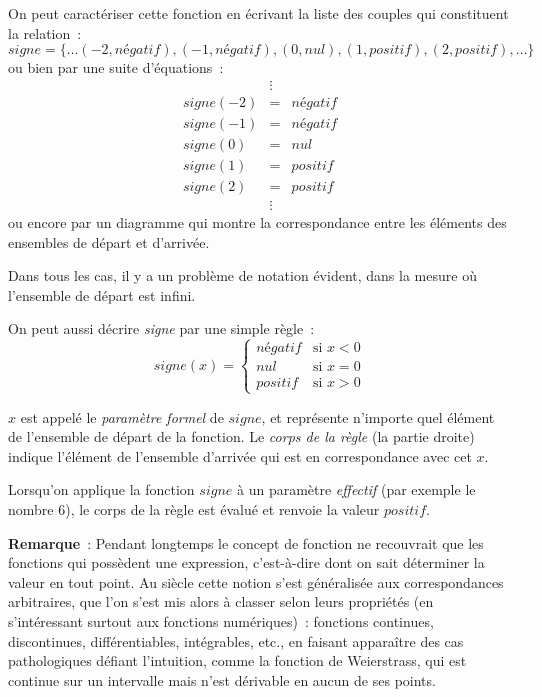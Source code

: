 On peut caractériser cette fonction en écrivant la liste des couples
qui constituent la relation~:
$$signe = \{ \ldots (-2,négatif), (-1,négatif), (0,nul), (1,positif),
(2,positif), \ldots \} $$
ou bien par une suite d'équations~:
\begin{eqnarray*}
& \vdots & \\
signe ( - 2 ) &=& négatif \\
signe ( - 1 ) &=& négatif \\
signe ( 0 ) &=& nul \\
signe ( 1 ) &=& positif \\
signe ( 2 ) &=& positif \\
 & \vdots & 
\end {eqnarray*}
ou encore par un diagramme qui montre la correspondance entre les
éléments des ensembles de départ et d'arrivée.

\begin{center}

\end{center}

Dans tous les cas, il y a un problème de notation évident, dans la
mesure où l'ensemble de départ est infini.

On peut aussi décrire \textsl{signe} par une simple règle~:
\[ 	signe ( x ) = \left\{
	\begin{array}{ll}
		négatif & \mbox{si $x<0$} \\
		nul	  & \mbox{si $x=0$} \\
		positif	  & \mbox{si $x>0$}
	\end{array}
	\right.  \]

    
$x$ est appelé le {\em paramètre formel} de $signe$, et 
représente n'importe quel élément de l'ensemble de 
départ de la fonction. Le \emph{corps de la règle} (la partie droite) 
indique l'élément de l'ensemble d'arrivée  
qui est en correspondance avec cet $x.$

Lorsqu'on applique la fonction $signe$ à un paramètre {\em effectif}
  (par exemple le nombre $6$), le corps de la règle est évalué et 
renvoie la valeur $positif$.

{\bf Remarque}~: Pendant longtemps le concept de fonction ne
recouvrait que les fonctions qui possèdent une expression,
c'est-à-dire dont on sait déterminer la valeur en tout point. Au
 siècle cette notion s'est généralisée aux correspondances
arbitraires, que l'on s'est mis alors à classer selon leurs propriétés
(en s'intéressant surtout aux fonctions numériques)~: fonctions
continues, discontinues, différentiables, intégrables, etc., en
faisant apparaître des cas pathologiques défiant l'intuition, comme la
fonction de Weierstrass, qui est continue sur un intervalle mais n'est
dérivable en aucun de ses points.


